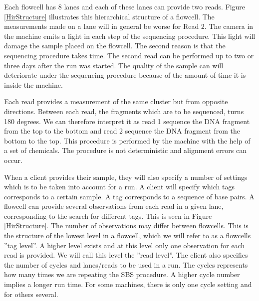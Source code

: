 
Each flowcell has 8 lanes and each of these lanes can provide two reads. Figure \ref{HirStructure} illustrates this hierarchical structure of a flowcell. The measurements made on a lane will in general be worse for Read 2. The camera in the machine emits a light in each step of the sequencing procedure. This light will damage the sample placed on the flowcell. The second reason is that the sequencing procedure takes time. The second read can be performed up to two or three days after the run was started. The quality of the sample can will deteriorate under the sequencing procedure because of the amount of time it is inside the machine. 

Each read provides a measurement of the same cluster but from opposite directions. Between each read, the fragments which are to be sequenced, turns 180 degrees. We can therefore interpret it as read 1 sequence the DNA fragment from the top to the bottom and read 2 sequence the DNA fragment from the bottom to the top. This procedure is performed by the machine with the help of a set of chemicals. The procedure is not deterministic and alignment errors can occur.

When a client provides their sample, they will also specify a number of settings which is to be taken into account for a run. A client will specify which tags corresponds to a certain sample. A tag corresponds to a sequence of base pairs. A flowcell can provide several observations from each read in a given lane, corresponding to the search for different tags. This is seen in Figure \ref{HirStructure}. The number of observations may differ between flowcells. This is the structure of the lowest level in a flowcell, which we will refer to as a flowcells ''tag level''. A higher level exists and at this level only one observation for each read is provided. We will call this level the ''read level''. The client also specifies the number of cycles and lanes/reads to be used in a run. The cycles represents how many times we are repeating the SBS procedure. A higher cycle number implies a longer run time. For some machines, there is only one cycle setting and for others several.

